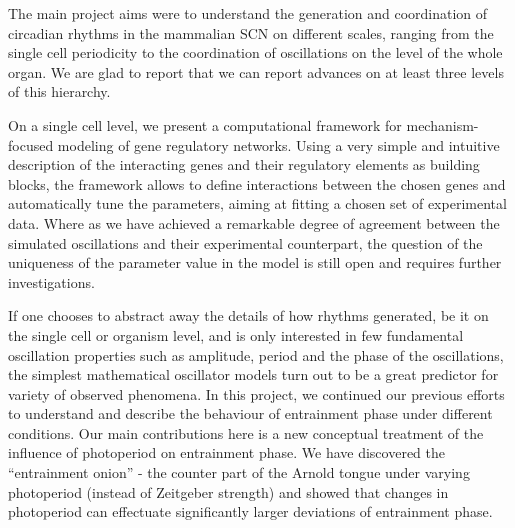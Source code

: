 The main project aims were to understand the generation and
coordination of circadian rhythms in the mammalian SCN on different
scales, ranging from the single cell periodicity to the coordination
of oscillations on the level of the whole organ. We are glad to report
that we can report advances on at least three levels of this
hierarchy.

On a single cell level, we present a computational framework for
mechanism-focused modeling of gene regulatory networks. Using a very
simple and intuitive description of the interacting genes and their
regulatory elements as building blocks, the framework allows to define
interactions between the chosen genes and automatically tune the
parameters, aiming at fitting a chosen set of experimental data. Where
as we have achieved a remarkable degree of agreement between the
simulated oscillations and their experimental counterpart, the
question of the uniqueness of the parameter value in the model is
still open and requires further investigations.

If one chooses to abstract away the details of how rhythms generated,
be it on the single cell or organism level, and is only interested in
few fundamental oscillation properties such as amplitude, period and
the phase of the oscillations, the simplest mathematical oscillator
models turn out to be a great predictor for variety of observed
phenomena. In this project, we continued our previous efforts to
understand and describe the behaviour of entrainment phase under
different conditions. Our main contributions here is a new conceptual
treatment of the influence of photoperiod on entrainment phase. We
have discovered the ``entrainment onion'' - the counter part of the
Arnold tongue under varying photoperiod (instead of Zeitgeber
strength) and showed that changes in photoperiod can effectuate
significantly larger deviations of entrainment phase.
